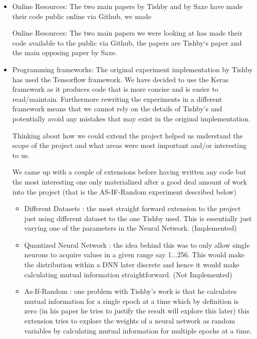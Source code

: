 \documentclass[dissertation.tex]{subfiles}
\begin{document}
\begin{itemize}
  \item{
      Online Resources: The two main papers by Tishby and by Saxe have made
      their code public online via Github, we made 

      Online Resources: The two main papers we were looking at has made their
      code available to the public via Github, the papers are Tishby`s paper and
      the main opposing paper by Saxe.
    }
  \item{
      Programming frameworks: The original experiment implementation by Tishby
      has used the Tensorflow framework. We have decided to use the Keras
      framework as it produces code that is more concise and is easier to
      read/maintain. Furthermore rewriting the experiments in a different
      framework means that we cannot rely on the details of Tishby's and
      potentially avoid any mistakes that may exist in the original
      implementation.
    }
    \begin{item}

      Thinking about how we could extend the project helped us understand the
      scope of the project and what areas were most important and/or interesting
      to us. 

      We came up with a couple of extensions before having written any code but
      the most interesting one only materialized after a good deal amount of
      work into the project (that is the AS-IF-Random experiment described
      below)

      \begin{itemize}
        \item{
            Different Datasets : the most straight forward extension to the
            project just using different dataset to the one Tishby used. This is
            essentially just varying one of the parameters in the Neural
            Network. (Implemented)
          }
        \item{
            Quantized Neural Network : the idea behind this was to only allow
            single neurons to acquire values in a given range say 1...256. This
            would make the distribution within a DNN later discrete and hence it
            would make calculating mutual information straightforward. (Not
            Implemented)
          }
        \item{
            As-If-Random : one problem with Tishby's work is that he calculates
            mutual information for a single epoch at a time which by definition
            is zero (in his paper he tries to justify the result will explore
            this later) this extension tries to explore the weights of a neural
            network as random variables by calculating mutual information for
            multiple epochs at a time.
          }
      \end{itemize}
    \end{item}
\end{itemize}
\end{document}
